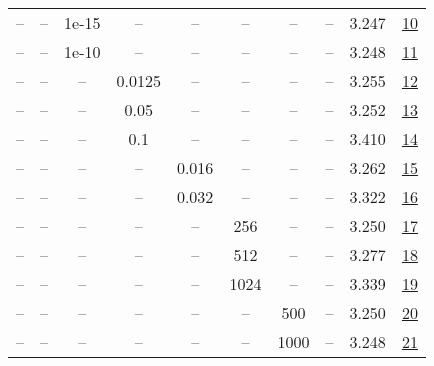 \begin{table}[H]
\begin{tabular}{cccccccccc}
-- & -- & 1e-15 & -- & -- & -- & -- & -- & 3.247 & \href{https://wandb.ai/stanford-mercury/optimizer-scaling/runs/sweep-130m-21B-marsbb9893lr0.008-wd0.1-minlr0-warmup2000-b10.98--61cf99}{10} \\
-- & -- & 1e-10 & -- & -- & -- & -- & -- & 3.248 & \href{https://wandb.ai/stanford-mercury/optimizer-scaling/runs/sweep-130m-21B-mars65f067lr0.008-wd0.1-minlr0-warmup2000-b10.98--00e186}{11} \\
-- & -- & -- & 0.0125 & -- & -- & -- & -- & 3.255 & \href{https://wandb.ai/stanford-mercury/optimizer-scaling/runs/sweep-130m-21B-mars45fc79lr0.008-wd0.1-minlr0-warmup2000-b10.98--665d81}{12} \\
-- & -- & -- & 0.05 & -- & -- & -- & -- & 3.252 & \href{https://wandb.ai/stanford-mercury/optimizer-scaling/runs/sweep-130m-21B-marsbb3d2dlr0.008-wd0.1-minlr0-warmup2000-b10.98--efa0b6}{13} \\
-- & -- & -- & 0.1 & -- & -- & -- & -- & 3.410 & \href{https://wandb.ai/stanford-mercury/optimizer-scaling/runs/sweep-130m-21B-marsef08aalr0.008-wd0.1-minlr0-warmup2000-b10.98--99e5eb}{14} \\
-- & -- & -- & -- & 0.016 & -- & -- & -- & 3.262 & \href{https://wandb.ai/stanford-mercury/optimizer-scaling/runs/sweep-130m-21B-marseec4ddlr0.016-wd0.1-minlr0-warmup2000-b10.98--a76048}{15} \\
-- & -- & -- & -- & 0.032 & -- & -- & -- & 3.322 & \href{https://wandb.ai/stanford-mercury/optimizer-scaling/runs/sweep-130m-21B-mars56ce49lr0.032-wd0.1-minlr0-warmup2000-b10.98--6ec527}{16} \\
-- & -- & -- & -- & -- & 256 & -- & -- & 3.250 & \href{https://wandb.ai/stanford-mercury/optimizer-scaling/runs/sweep-130m-21B-mars3da2b9lr0.008-wd0.1-minlr0-warmup2000-b10.98--21bf02}{17} \\
-- & -- & -- & -- & -- & 512 & -- & -- & 3.277 & \href{https://wandb.ai/stanford-mercury/optimizer-scaling/runs/sweep-130m-21B-mars41b2f4lr0.008-wd0.1-minlr0-warmup2000-b10.98--bcbde5}{18} \\
-- & -- & -- & -- & -- & 1024 & -- & -- & 3.339 & \href{https://wandb.ai/stanford-mercury/optimizer-scaling/runs/sweep-130m-21B-mars3adad7lr0.008-wd0.1-minlr0-warmup2000-b10.98--024b89}{19} \\
-- & -- & -- & -- & -- & -- & 500 & -- & 3.250 & \href{https://wandb.ai/stanford-mercury/optimizer-scaling/runs/sweep-130m-21B-mars602214lr0.008-wd0.1-minlr0-warmup500-b10.98-b-4209ae}{20} \\
-- & -- & -- & -- & -- & -- & 1000 & -- & 3.248 & \href{https://wandb.ai/stanford-mercury/optimizer-scaling/runs/sweep-130m-21B-mars998481lr0.008-wd0.1-minlr0-warmup1000-b10.98--5adede}{21} \\

\end{tabular}
\end{table}
